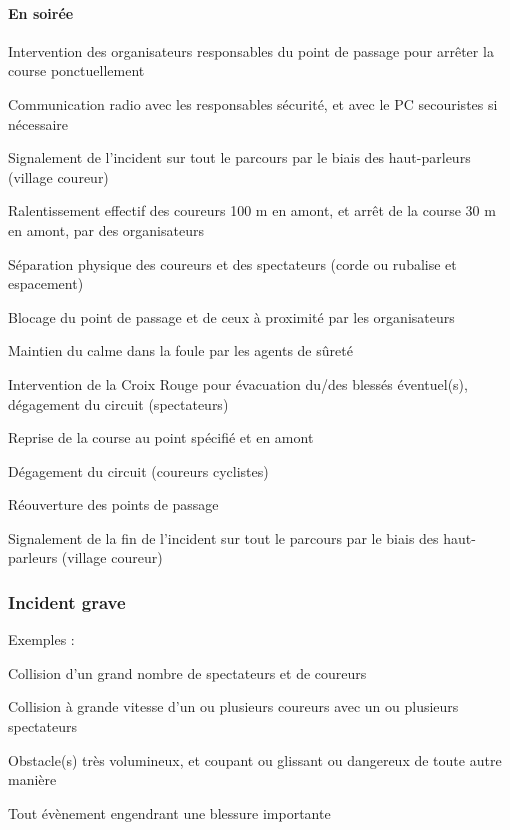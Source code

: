 \documentclass[hidelinks, paper=a4, fontsize=13pt]{report}
\begin{document}
\paragraph{En soirée}
\begin{list}{•}{}
\item Intervention des organisateurs responsables du point de passage pour arrêter la course ponctuellement 
\item Communication radio avec les responsables sécurité, et avec le PC secouristes si nécessaire
\item Signalement de l’incident sur tout le parcours par le biais des haut-parleurs (village coureur)
\item Ralentissement effectif des coureurs 100 m en amont, et arrêt de la course  30 m en amont, par des organisateurs
\item Séparation physique des coureurs et des spectateurs (corde ou rubalise et espacement)
\item Blocage du point de passage et de ceux à proximité par les organisateurs
\item Maintien du calme dans la foule par les agents de sûreté
\item Intervention de la Croix Rouge pour évacuation du/des blessés éventuel(s), dégagement du circuit (spectateurs)
\item Reprise de la course au point spécifié et en amont
\item Dégagement du circuit (coureurs cyclistes)
\item Réouverture des points de passage
\item Signalement de la fin de l’incident sur tout le parcours par le biais des haut-parleurs (village coureur)
\end{list}


\subsubsection{Incident grave}

Exemples :
\begin{list}{•}{}
\item Collision d’un grand nombre de spectateurs et de coureurs
\item Collision à grande vitesse d’un ou plusieurs coureurs avec un ou plusieurs spectateurs
\item Obstacle(s) très volumineux, et coupant ou glissant ou dangereux de toute autre manière
\item Tout évènement engendrant une blessure importante
\end{list}
\end{document}
